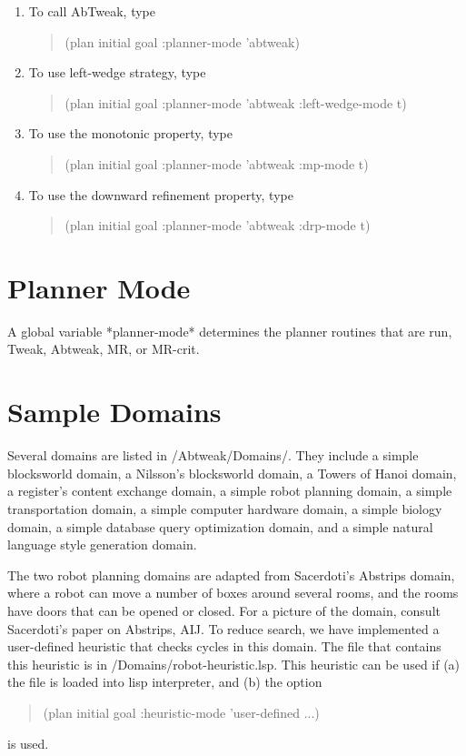 \begin{enumerate}
\item To call AbTweak, type 
\begin{quote}
(plan initial goal :planner-mode 'abtweak)
\end{quote}
\item To use left-wedge strategy, type
\begin{quote}
(plan initial goal :planner-mode 'abtweak :left-wedge-mode t)
\end{quote}
\item To use the monotonic property, type
\begin{quote}
(plan initial goal :planner-mode 'abtweak :mp-mode t)
\end{quote}
\item To use the downward refinement property, type
\begin{quote}
(plan initial goal :planner-mode 'abtweak :drp-mode t)
\end{quote}
\end{enumerate}

\section{Planner Mode}
A global variable *planner-mode* determines the planner routines that
are run,  Tweak, Abtweak, MR, or MR-crit.

\section{Sample Domains}
Several domains are listed in /Abtweak/Domains/.
They include a simple blocksworld domain, a Nilsson's blocksworld
domain, a Towers of Hanoi domain, a register's content exchange 
domain, a simple robot planning domain, a simple transportation
domain, a simple computer hardware domain, a simple biology
domain,  a simple database query optimization domain, and a simple
natural language style generation domain.

The two robot planning domains are adapted from Sacerdoti's Abstrips
domain, where a robot can move a number of boxes around several rooms,
and the rooms have doors that can be opened or closed.  For a picture
of the domain, consult Sacerdoti's paper on Abstrips, AIJ.  To reduce
search, we have implemented a user-defined heuristic that checks
cycles in this domain.  The file that contains this heuristic is in
/Domains/robot-heuristic.lsp.  This heuristic can be used if (a) the
file is loaded into lisp interpreter, and (b) the option
\begin{quote}
(plan initial goal :heuristic-mode 'user-defined ...) 
\end{quote}
is used.

